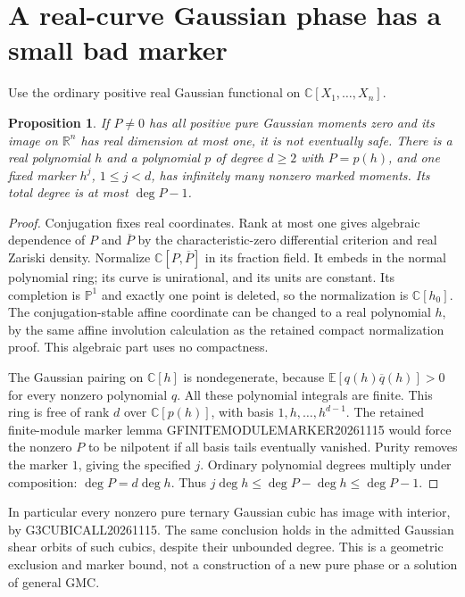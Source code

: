 \documentclass[11pt]{article}
\newtheorem{proposition}{Proposition}
\newcommand{\C}{\mathbb C}
\begin{document}
\section{A real-curve Gaussian phase has a small bad marker}
Use the ordinary positive real Gaussian functional on $\C[X_1,\ldots,X_n]$.
\begin{proposition}
If $P\ne0$ has all positive pure Gaussian moments zero and its image on
$\mathbb R^n$ has real dimension at most one, it is not eventually safe.
There is a real polynomial $h$ and a polynomial $p$ of degree $d\ge2$ with
$P=p(h)$, and one fixed marker $h^j$, $1\le j<d$, has infinitely many nonzero
marked moments. Its total degree is at most $\deg P-1$.
\end{proposition}
\begin{proof}
Conjugation fixes real coordinates. Rank at most one gives algebraic
dependence of $P$ and $\overline P$ by the characteristic-zero differential
criterion and real Zariski density. Normalize $\C[P,\overline P]$ in its
fraction field. It embeds in the normal polynomial ring; its curve is
unirational, and its units are constant. Its completion is $\mathbb P^1$
and exactly one point is deleted, so the normalization is $\C[h_0]$.
The conjugation-stable affine coordinate can be changed to a real polynomial
$h$, by the same affine involution calculation as the retained compact
normalization proof. This algebraic part uses no compactness.

The Gaussian pairing on $\C[h]$ is nondegenerate, because
$\mathbb E[q(h)\overline q(h)]>0$ for every nonzero polynomial $q$.
All these polynomial integrals are finite. This ring is free of rank $d$
over $\C[p(h)]$, with basis $1,h,\ldots,h^{d-1}$. The retained finite-module
marker lemma GFINITEMODULEMARKER20261115 would force the nonzero $P$ to
be nilpotent if all basis tails eventually vanished. Purity removes the
marker $1$, giving the specified $j$. Ordinary polynomial degrees multiply
under composition: $\deg P=d\deg h$. Thus $j\deg h\le\deg P-\deg h\le\deg P-1$.
\end{proof}
In particular every nonzero pure ternary Gaussian cubic has image with
interior, by G3CUBICALL20261115. The same conclusion holds in the admitted
Gaussian shear orbits of such cubics, despite their unbounded degree.
This is a geometric exclusion and marker bound, not a construction of a
new pure phase or a solution of general GMC.
\end{document}
